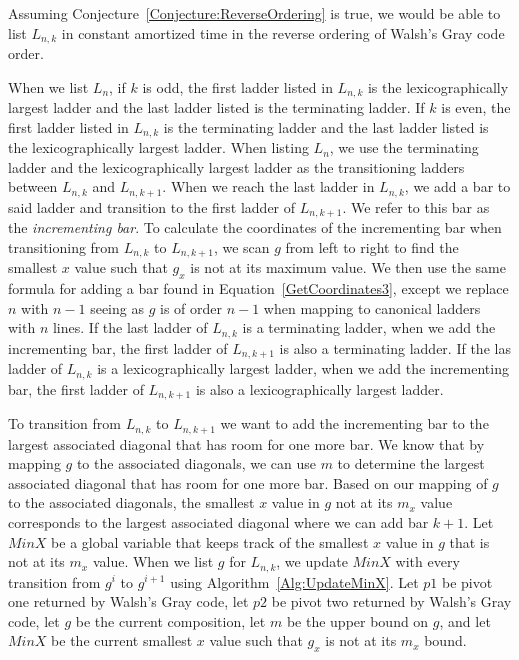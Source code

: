 \begin{theorem}
\begin{theorem}
Assuming Conjecture~\ref{Conjecture:ReverseOrdering} is true, 
we would be able to list $L_{n,k}$  in constant amortized time in 
the reverse ordering of Walsh's Gray code order.\par
When we list $L_{n}$, if $k$ is odd, the first ladder listed in $L_{n,k}$ is the lexicographically 
largest ladder and the last ladder listed is the terminating ladder. If $k$ is even, 
the first ladder listed in $L_{n,k}$ is the terminating ladder and the last ladder listed is the lexicographically largest ladder.
When listing $L_{n}$, we use the terminating ladder and the lexicographically largest ladder as the transitioning 
ladders between $L_{n,k}$ and $L_{n,k+1}$. When we reach the last ladder in $L_{n,k}$, we add a bar 
to said ladder and transition to the first ladder of $L_{n, k+1}$. We refer to this bar as the \emph{incrementing bar}. 
To calculate the coordinates of the incrementing bar when transitioning 
from $L_{n,k}$ to $L_{n,k+1}$, we scan $g$ from left to right to find the smallest $x$ 
value such that $g_{x}$ is not at its maximum value. We then use the same formula for adding a bar found in Equation~\ref{GetCoordinates3}, 
except we replace $n$ with $n-1$ seeing as $g$ is of order $n-1$ when mapping to canonical ladders with $n$ lines. If the last ladder 
of $L_{n,k}$ is a terminating ladder, when we add the incrementing bar, the first ladder of $L_{n,k+1}$ is also a terminating ladder. If the 
las ladder of $L_{n,k}$ is a lexicographically largest ladder, when we add the incrementing bar, the first ladder of $L_{n,k+1}$ is also a 
lexicographically largest ladder.\par 
To transition from $L_{n, k}$ to $L_{n, k+1}$ we want to add the incrementing bar to the 
largest associated diagonal that has room for one more bar. We know that by mapping 
$g$ to the associated diagonals, we can use $m$ to determine the largest associated diagonal that has room for one more bar. 
Based on our mapping of $g$ to the associated diagonals, the smallest $x$ value in $g$ not at its $m_{x}$ value corresponds to the largest 
associated diagonal where we can add bar $k+1$. 
Let $MinX$ be a global variable that keeps track of the smallest $x$ value in $g$ that is not at its 
$m_{x}$ value. When we list $g$ for $L_{n,k}$, we update $MinX$ with every transition from $g^{i}$ to $g^{i+1}$ using Algorithm~\ref{Alg:UpdateMinX}.
Let $p1$ be pivot one returned by Walsh's Gray code, let $p2$ be pivot two returned by Walsh's Gray code, let $g$ be the current composition, 
 let $m$ be the upper bound on $g$, and let $MinX$ be the current smallest $x$ value such that $g_{x}$ is not at its $m_{x}$ bound.\pagebreak

\end{theorem}
\end{theorem}
